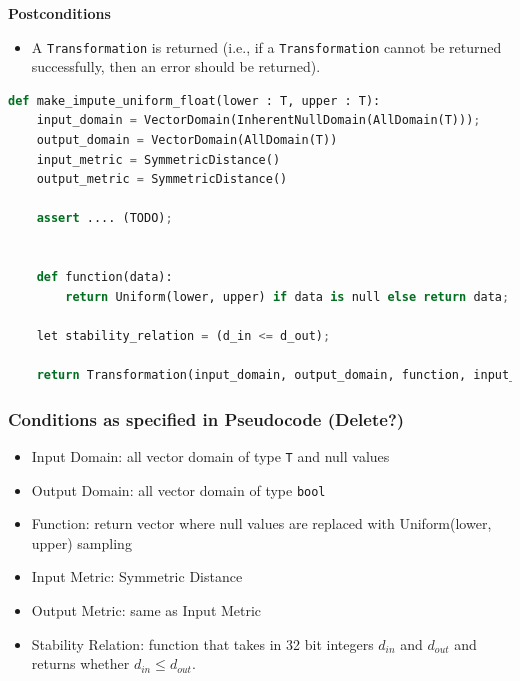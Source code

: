 \documentclass[11pt,a4paper]{article}
\begin{document}
\noindent \textbf{Postconditions}
\begin{itemize}
    \item A \texttt{Transformation} is returned (i.e., if a \texttt{Transformation} cannot be returned successfully, then an error should be returned).
\end{itemize}


\begin{lstlisting}[language=Python]
def make_impute_uniform_float(lower : T, upper : T):
    input_domain = VectorDomain(InherentNullDomain(AllDomain(T)));
    output_domain = VectorDomain(AllDomain(T))
    input_metric = SymmetricDistance()
    output_metric = SymmetricDistance()

    assert .... (TODO);
    
    
    def function(data): 
        return Uniform(lower, upper) if data is null else return data;

    let stability_relation = (d_in <= d_out);
    
    return Transformation(input_domain, output_domain, function, input_metric, output_metric, stability_relation)

\end{lstlisting}






\subsubsection{Conditions as specified in Pseudocode (Delete?)}
\begin{itemize}
    \item Input Domain: all vector domain of type \texttt{T} and null values
    \item Output Domain: all vector domain of type \texttt{bool}
    \item Function: return vector where null values are replaced with Uniform(lower, upper) sampling
    \item Input Metric: Symmetric Distance 
    \item Output Metric: same as Input Metric
    \item Stability Relation: function that takes in 32 bit integers $d_{in}$ and $d_{out}$ and returns whether $d_{in} \leq d_{out}.$
\end{itemize}
\end{document}
